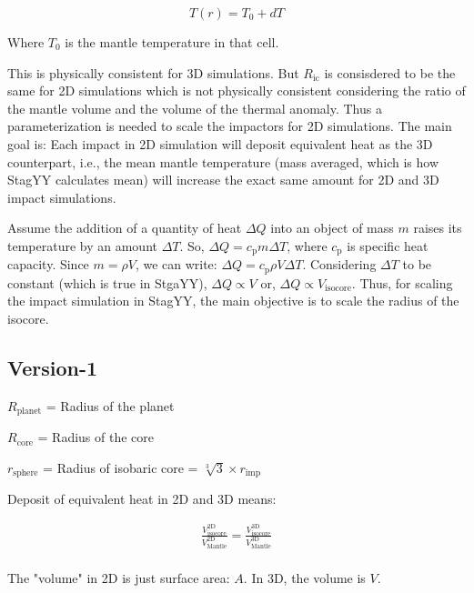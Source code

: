 \documentclass[12pt]{extarticle}
\begin{document}
\begin{equation} \label{T_imp}
    T (r) = T_0 + dT
\end{equation}

Where $T_0$ is the mantle temperature in that cell.

This is physically consistent for 3D simulations. But $R_{\mathrm{ic}}$ is consisdered to be the same for 2D simulations which is not physically consistent considering the ratio of the mantle volume and the volume of the thermal anomaly. Thus a parameterization is needed to scale the impactors for 2D simulations. The main goal is: Each impact in 2D simulation will deposit equivalent heat as the 3D counterpart, i.e., the mean mantle temperature (mass averaged, which is how StagYY calculates mean) will increase the exact same amount for 2D and 3D impact simulations.

Assume the addition of a quantity of heat $\Delta Q$ into an object of mass $m$ raises its temperature by an amount $\Delta T$. So, $\Delta Q = c_{\mathrm{p}} m \Delta T$, where $c_{\mathrm{p}}$ is specific heat capacity. Since $m = \rho V$, we can write: $\Delta Q = c_{\mathrm{p}} \rho V \Delta T$. Considering $\Delta T$ to be constant (which is true in StgaYY), $\Delta Q \propto V$ or, $\Delta Q \propto V_{\mathrm{isocore}}$. Thus, for scaling the impact simulation in StagYY, the main objective is to scale the radius of the isocore.

\clearpage



\subsection{Version-1}

$R_{\mathrm{planet}}$ = Radius of the planet

$R_{\mathrm{core}}$ = Radius of the core

$r_{\mathrm{sphere}}$ = Radius of isobaric core = $\sqrt[3]{3} \times r_{\mathrm{imp}}$ 

Deposit of equivalent heat in 2D and 3D means:

\begin{align*}
   \frac{V_{\mathrm{isocore}}^{2\mathrm{D}}}{V_{\mathrm{Mantle}}^{2\mathrm{D}}} = \frac{V_{\mathrm{isocore}}^{3\mathrm{D}}}{V_{\mathrm{Mantle}}^{3\mathrm{D}}} \\
\end{align*}

The "volume" in 2D is just surface area: $A$. In 3D, the volume is $V$.
\end{document}
